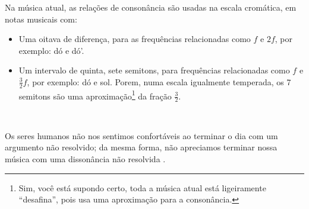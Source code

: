 Na música atual, as relações de consonância são usadas na escala cromática, 
em notas musicais com:
\begin{itemize} 
\item Uma oitava de diferença, para as frequências relacionadas como $f$ e $2f$, 
por exemplo: dó e dó'.
\item Um intervalo de quinta, sete semitons, para frequências relacionadas como  $f$ e $\frac{3}{2}f$, 
por exemplo: dó e sol. Porem, numa escala igualmente temperada, 
os 7 semitons são uma aproximação\footnote{Sim, você está supondo certo,
toda a música atual está ligeiramente ``desafina'', pois usa uma aproximação para a consonância.}
 da fração $\frac{3}{2}$.
\end{itemize}~


Os seres humanos não nos sentimos confortáveis ao terminar o dia com um argumento não resolvido; 
da mesma forma, não apreciamos terminar nossa música com uma dissonância não resolvida \cite[pp. 26]{wright2012essential}.

